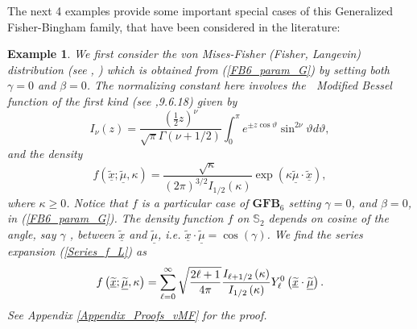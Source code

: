 \documentclass[preprint,11pt,a4paper]{elsarticle}
\newtheorem{example}[theorem]{Example}
\begin{document}
\smallskip The next 4 examples provide some important special cases of this
Generalized Fisher-Bingham family, that have been considered in the
literature:

\begin{example}
\label{Ex_vMF} We first consider the \textit{von Mises-Fisher} (Fisher,
Langevin) distribution (see \cite{fisher1953dispersion}, \cite%
{jammalamadaka2001topics}) which is obtained from (\ref{FB6_param_G}) by
setting both $\gamma=0$ and $\beta=0$. The normalizing constant here
involves the \textbf{\ }Modified Bessel function of the first kind (see \cite%
{Abramowit12},9.6.18) given by 
\begin{equation*}
I_{\nu}\left( z\right) =\frac{\left( \frac{1}{2}z\right) ^{\nu}}{\sqrt {\pi}%
\Gamma\left( \nu+1/2\right) }\int_{0}^{\pi}e^{\pm
z\cos\vartheta}\sin^{2\nu}\vartheta d\vartheta,
\end{equation*}
and the density%
\begin{equation*}
f\left( \underline{\widetilde{x}};\underline{\widetilde{\mu}},\kappa\right) =%
\frac{\sqrt{\kappa}}{\left( 2\pi\right) ^{3/2}I_{1/2}\left( \kappa\right) }%
\exp\left( \kappa\underline{\widetilde{\mu}}\cdot\underline{\widetilde{x}}%
\right) ,
\end{equation*}
where $\kappa\geq0$. Notice that $f$ is a particular case of $\mathbf{GFB}%
_{6}$ setting $\gamma=0$, and $\beta=0$, in (\ref{FB6_param_G}). The density
function $f$ on $\mathbb{S}_{2}$ depends on cosine of the angle, say $\gamma$%
, between $\underline{\widetilde{x}}$ and $\underline{\widetilde{\mu}}$,
i.e. $\underline{\widetilde{x}}\cdot\underline{\widetilde{\mu}}=\cos\left(
\gamma\right) $. We find the series expansion (\ref{Series_f_L}) as 
\begin{equation}
f\left( \underline{\widetilde{x}};\underline{\widetilde{\mu}},\kappa\right)
=\sum_{\ell=0}^{\infty}\sqrt{\frac{2\ell+1}{4\pi}}\frac{I_{\ell+1/2}\left(
\kappa\right) }{I_{1/2}\left( \kappa\right) }Y_{\ell}^{0}\left( \underline{%
\widetilde{x}}\cdot\underline{\widetilde{\mu}}\right) .
\label{Density_Fisher}
\end{equation}
See Appendix \ref{Appendix_Proofs_vMF} for the proof.
\end{example}

\begin{comment}%

, $\underline{\widetilde{\mu}}=\left( \sin\alpha\cos\beta,\sin\alpha\sin
\beta,\cos\alpha\right) ^{\top}$

\end{comment}%
\end{document}
